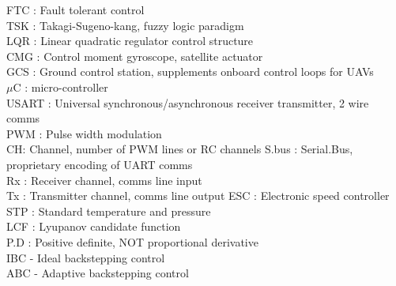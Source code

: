 \documentclass[a4paper, 11pt, oneside, openright, parskip=full]{book}
\begin{document}
FTC : Fault tolerant control\\
TSK : Takagi-Sugeno-kang, fuzzy logic paradigm\\
LQR : Linear quadratic regulator control structure\\
CMG : Control moment gyroscope, satellite actuator\\
GCS : Ground control station, supplements onboard control loops for UAVs\\
$\mu$C : micro-controller\\
USART : Universal synchronous/asynchronous receiver transmitter, 2 wire comms\\
PWM : Pulse width modulation\\
CH: Channel, number of PWM lines or RC channels
S.bus : Serial.Bus, proprietary encoding of UART comms\\
Rx : Receiver channel, comms line input\\
Tx : Transmitter channel, comms line output
ESC : Electronic speed controller\\
STP : Standard temperature and pressure\\
LCF : Lyupanov candidate function\\
P.D : Positive definite, NOT proportional derivative\\
IBC - Ideal backstepping control\\
ABC - Adaptive backstepping control\\
\end{document}
